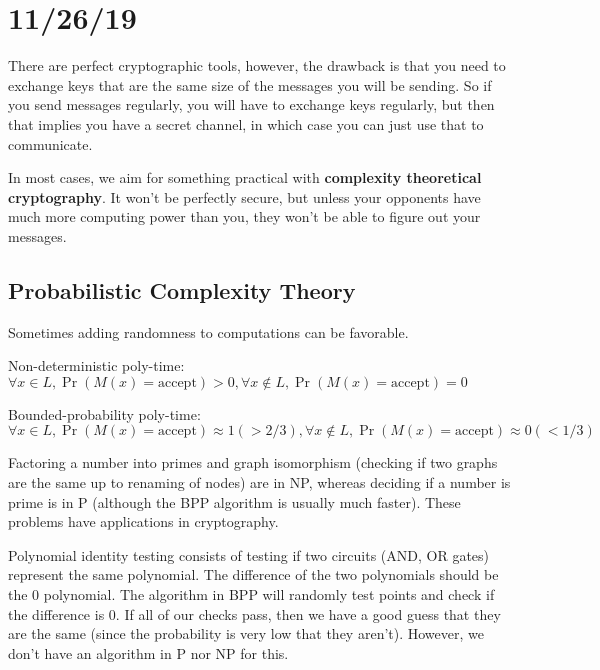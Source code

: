 \documentclass[12 pt]{article}
\begin{document}
\section{11/26/19}
There are perfect cryptographic tools, however, the drawback is that
you need to exchange keys that are the same size of the messages you
will be sending. So if you send messages regularly, you will have to
exchange keys regularly, but then that implies you have a secret
channel, in which case you can just use that to communicate.

In most cases, we aim for something practical with \textbf{complexity
  theoretical cryptography}. It won't be perfectly secure, but unless
your opponents have much more computing power than you, they won't be
able to figure out your messages.

\subsection{Probabilistic Complexity Theory}
Sometimes adding randomness to computations can be favorable.

Non-deterministic poly-time: $\forall x \in L, \Pr(M(x) =
\text{accept}) >0, \forall x \notin L, \Pr(M(x)=\text{accept}) = 0$

Bounded-probability poly-time: $\forall x \in L, \Pr(M(x) =
\text{accept}) \approx 1 (> 2/3), \forall x \notin L, \Pr(M(x) =
\text{accept}) \approx 0 (< 1/3)$

Factoring a number into primes and graph isomorphism (checking if two
graphs are the same up to renaming of nodes) are in NP, whereas
deciding if a number is prime is in P (although the BPP algorithm is
usually much faster). These problems have applications in
cryptography.

Polynomial identity testing consists of testing if two circuits (AND,
OR gates) represent the same polynomial. The difference of the two
polynomials should be the $0$ polynomial. The algorithm in BPP will
randomly test points and check if the difference is $0$. If all of our
checks pass, then we have a good guess that they are the same (since
the probability is very low that they aren't). However, we don't have
an algorithm in P nor NP for this.
\end{document}
